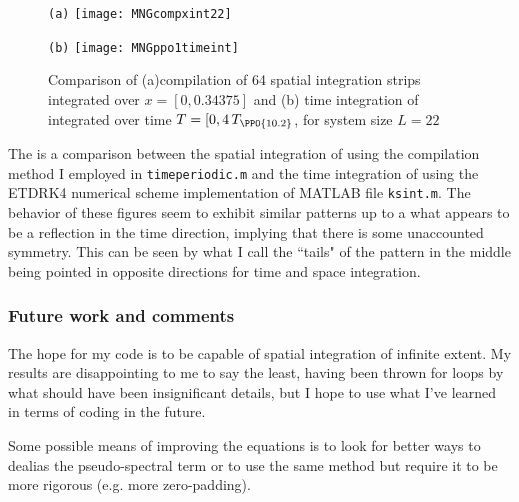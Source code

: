 \begin{figure}[h]
  \begin{minipage}[height=.40\textheight]{.35\textwidth}
    \centering \small{\texttt{(a)}}
    \texttt{[image: MNGcompxint22]}
  \end{minipage}
  \begin{minipage}[height=.40\textheight]{.35\textwidth}
    \centering \small{\texttt{(b)}}
    \texttt{[image: MNGppo1timeint]}
  \end{minipage}
   \caption{Comparison of (a)compilation of 64 spatial integration strips integrated over $x=[0,0.34375]$ and (b) time integration of  integrated over time $T = [0,4\,T_{\PPO{10.2}}$, for system size $L=22$}
  \label{fig:MNGrfig2}
\end{figure}

The  is a comparison between the spatial integration
of  using the compilation method I employed in
\texttt{timeperiodic.m} and the time integration of 
using the ETDRK4 numerical scheme implementation of MATLAB file
\texttt{ksint.m}. The behavior of these figures seem to exhibit similar
patterns up to a what appears to be a reflection in the time direction,
implying that there is some unaccounted symmetry. This can be seen by
what I call the ``tails" of the pattern in the middle being pointed in
opposite directions for time and space integration.



\subsubsection{Future work and comments}
\label{sect:MNGfuture}

The hope for my code is to be capable of spatial integration of infinite extent. My results are disappointing to me to say the least, having been thrown for loops by what should have been insignificant details, but I hope to use what I've learned in terms of coding in the future.

Some possible means of improving the equations is to look for better ways to dealias the pseudo-spectral term or to use the same method but require it to be more rigorous (e.g. more zero-padding).

